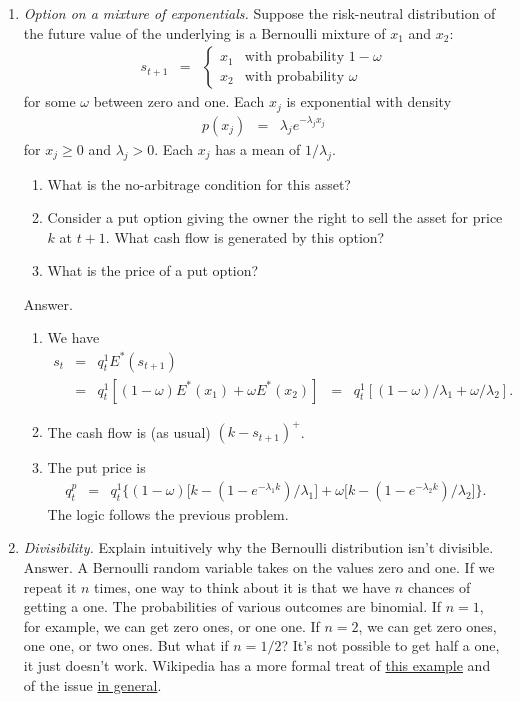 \documentclass[11pt]{article}
\begin{document}
\begin{enumerate}
\item {\it Option on a mixture of exponentials.\/}
Suppose the risk-neutral distribution of the future value of the underlying
is a Bernoulli mixture of $x_1$ and $x_2$:
\begin{eqnarray*}
    s_{t+1} &=&
        \left\{
        \begin{array}{ll}
            x_1 & \mbox{with probability } 1-\omega \\
            x_2 & \mbox{with probability } \omega
        \end{array}
        \right.
\end{eqnarray*}
for some $\omega$ between zero and one.
Each $x_j$ is exponential with density
\begin{eqnarray*}
    p(x_j) &=& \lambda_j e^{-\lambda_j x_j}
\end{eqnarray*}
for $x_j \geq 0$ and $\lambda_j > 0$.
Each $x_j$ has a mean of $1/\lambda_j$.
%
\begin{enumerate}
\item What is the no-arbitrage condition for this asset?
\item Consider a put option giving the owner the right to sell
the asset for price $k$ at $t+1$.
What cash flow is generated by this option?
\item What is the price of a put option?
\end{enumerate}
%
Answer.
\begin{enumerate}
\item We have
\begin{eqnarray*}
    s_t &=& q^1_t E^* (s_{t+1}) \\
            &=& q^1_t [(1-\omega) E^*(x_1) + \omega E^*(x_2)]
            \;\;=\;\; q^1_t [(1-\omega)/\lambda_1 + \omega /\lambda_2] .
\end{eqnarray*}
\item The cash flow is (as usual) $ (k-s_{t+1})^+ $.
\item The put price is
\begin{eqnarray*}
    q^p_t &=& q^1_t \Big\{
        (1-\omega) \big[ k - ( 1-e^{-\lambda_1 k})/\lambda_1 \big] 
        + \omega \big[ k - ( 1-e^{-\lambda_2 k})/\lambda_2 \big]
        \Big\} .
\end{eqnarray*}
The logic follows the previous problem.
\end{enumerate}


\item {\it Divisibility.\/} Explain intuitively why the Bernoulli distribution isn't divisible.
%
Answer. A Bernoulli random variable takes on the values zero and one.
If we repeat it $n$ times, one way to think about it is that
we have $n$ chances of getting a one.
The probabilities of various outcomes are binomial.
If $n=1$, for example, we can get zero ones, or one one.
If $n=2$, we can get zero ones, one one, or two ones.
But what if $n=1/2$?
It's not possible to get half a one, it just doesn't work.
Wikipedia has a more formal treat of
\href{http://en.wikipedia.org/wiki/Indecomposable_distribution}{this example}
and of the issue
\href{http://en.wikipedia.org/wiki/Infinite_divisibility_(probability)}
{in general}.



\end{enumerate}
\end{document}
